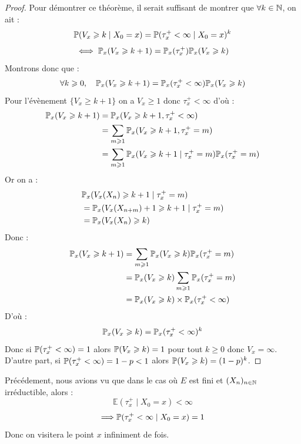\begin{proof}
    Pour démontrer ce théorème, il serait suffisant de montrer que $ \forall k \in \mathbb{N}$, on ait : 
        \[ \mathbb{P}(V_x \geqslant k \mid X_0 = x) = \mathbb{P}( \tau_x^+ < \infty \mid X_0 = x)^k \] 
        \[ \iff \mathbb{P}_x(V_x \geqslant k+1) = \mathbb{P}_x( \tau_x^+) \mathbb{P}_x(V_x \geqslant k) \]      
    Montrons donc que : 
        \[ \forall k \geqslant0, \quad \mathbb{P}_x( V_x \geqslant k+1) = \mathbb{P}_x( \tau_x^+ < \infty) \mathbb{P}_x(V_x \geqslant k)  \] 
    Pour l'évènement $ \{V_x \geqslant k+1\}$ on a $V_x \geqslant 1$ donc $ \tau_x^+ < \infty$ d'où : 
        \begin{align*}
            \mathbb{P}_x(V_x \geqslant k+1) &= \mathbb{P}_x(V_x \geqslant k+1, \tau_x^+ < \infty) \\ 
            &= \sum_{m \geqslant 1} \mathbb{P}_x(V_x \geqslant k+1, \tau_x^+ = m) \\ 
            &= \sum_{m \geqslant 1} \mathbb{P}_x(V_x \geqslant k+1 \; | \; \tau_x^+ = m) \mathbb{P}_x(\tau_x^+ = m)
        \end{align*}
    Or on a : 
        \begin{align*}
            & \mathbb{P}_x(V_x(X_n) \geqslant k+1 \; | \; \tau_x^+ = m) \\
            &=  \mathbb{P}_x(V_x(X_{n+m}) +1\geqslant k+1 \; | \; \tau_x^+ = m) \\
            &= \mathbb{P}_x(V_x(X_n) \geqslant k)
        \end{align*}
    Donc : 
        \begin{align*}
            \mathbb{P}_x(V_x \geqslant k+1) &= \sum_{m \geqslant 1} \mathbb{P}_x(V_x \geqslant k) \mathbb{P}_x( \tau_x^+ = m) \\ 
            &= \mathbb{P}_x(V_x \geqslant k) \sum_{m \geqslant 1} \mathbb{P}_x( \tau_x^+ = m) \\ 
            &= \mathbb{P}_x(V_x \geqslant k) \times \mathbb{P}_x( \tau_x^+ < \infty) 
        \end{align*}
    D'où : 
        \[ \mathbb{P}_x( V_x \geqslant k) = \mathbb{P}_x( \tau_x^+ < \infty)^k  \]
    Donc si $ \mathbb{P}( \tau_x^+ < \infty) = 1$ alors $ \mathbb{P}(V_x \geqslant k) = 1 $ pour tout $k \geqslant 0$ donc 
    $V_x = \infty$. D'autre part, si $\mathbb{P}( \tau_x^+ < \infty) = 1 - p < 1$ alors $\mathbb{P}(V_x \geqslant k) = (1-p)^k$. 
\end{proof}

\begin{remark}
    Précédement, nous avions vu que dans le cas où $E$ est fini et $(X_n)_{n \in \mathbb{N}}$ irréductible, alors : 
        \[ \mathbb{E}( \tau_x^+ \; | \; X_0 = x)  < \infty \]
        \[ \Longrightarrow \mathbb{P}( \tau_x^+ < \infty \; | \; X_0 = x) = 1  \]  
    Donc on visitera le point $x$ infiniment de fois. 
\end{remark}

